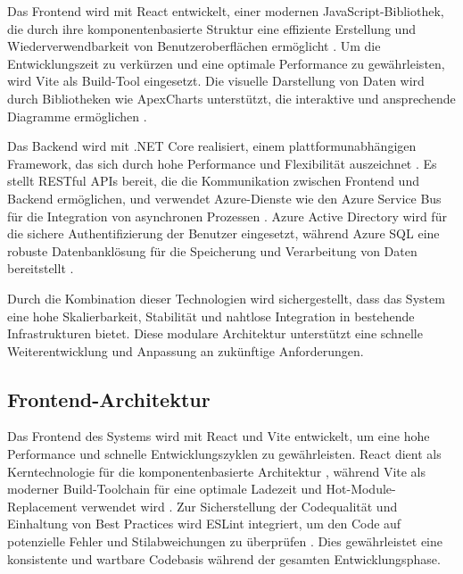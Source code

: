 Das Frontend wird mit React entwickelt, einer modernen JavaScript-Bibliothek, die durch ihre komponentenbasierte Struktur eine effiziente Erstellung und Wiederverwendbarkeit von Benutzeroberflächen ermöglicht \cite{stefanov2021react}. Um die Entwicklungszeit zu verkürzen und eine optimale Performance zu gewährleisten, wird Vite als Build-Tool eingesetzt. Die visuelle Darstellung von Daten wird durch Bibliotheken wie ApexCharts unterstützt, die interaktive und ansprechende Diagramme ermöglichen \cite{apexchartsDoc}.

Das Backend wird mit .NET Core realisiert, einem plattformunabhängigen Framework, das sich durch hohe Performance und Flexibilität auszeichnet \cite{microsoftDotNet}. Es stellt RESTful APIs bereit, die die Kommunikation zwischen Frontend und Backend ermöglichen, und verwendet Azure-Dienste wie den Azure Service Bus für die Integration von asynchronen Prozessen \cite{azureServiceBus}. Azure Active Directory wird für die sichere Authentifizierung der Benutzer eingesetzt, während Azure SQL eine robuste Datenbanklösung für die Speicherung und Verarbeitung von Daten bereitstellt \cite{azureDocumentation}.

Durch die Kombination dieser Technologien wird sichergestellt, dass das System eine hohe Skalierbarkeit, Stabilität und nahtlose Integration in bestehende Infrastrukturen bietet. Diese modulare Architektur unterstützt eine schnelle Weiterentwicklung und Anpassung an zukünftige Anforderungen.


\subsection{Frontend-Architektur}
Das Frontend des Systems wird mit React und Vite entwickelt, um eine hohe Performance und schnelle Entwicklungszyklen zu gewährleisten. React dient als Kerntechnologie für die komponentenbasierte Architektur \cite{facebook2021react}, während Vite als moderner Build-Toolchain für eine optimale Ladezeit und Hot-Module-Replacement verwendet wird \cite{vite2022docs}. Zur Sicherstellung der Codequalität und Einhaltung von Best Practices wird ESLint integriert, um den Code auf potenzielle Fehler und Stilabweichungen zu überprüfen \cite{eslint2022guide}. Dies gewährleistet eine konsistente und wartbare Codebasis während der gesamten Entwicklungsphase.

